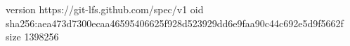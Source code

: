version https://git-lfs.github.com/spec/v1
oid sha256:aea473d7300ecaa46595406625f928d523929dd6e9faa90c44c692e5d9f5662f
size 1398256
